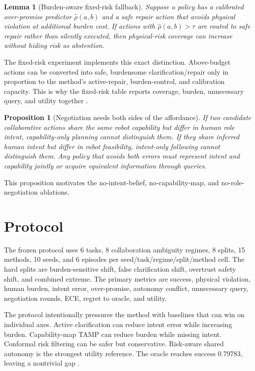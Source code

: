 \documentclass{article}
\newtheorem{lemma}{Lemma}
\newtheorem{proposition}{Proposition}
\begin{document}
\begin{lemma}[Burden-aware fixed-risk fallback]
Suppose a policy has a calibrated over-promise predictor $\hat \rho(a,b)$ and a safe repair action that avoids physical violation at additional burden cost. If actions with $\hat \rho(a,b)>\tau$ are routed to safe repair rather than silently executed, then physical-risk coverage can increase without hiding risk as abstention.
\end{lemma}
\noindent The fixed-risk experiment implements this exact distinction. Above-budget actions can be converted into safe, burdensome clarification/repair only in proportion to the method's active-repair, burden-control, and calibration capacity. This is why the fixed-risk table reports coverage, burden, unnecessary query, and utility together \citep{chan2020an31,rezayati2022improving32,liu2022human33,rahman2017cyberphysicalsocial34,umbrico2022design35,pantano2022influence36,zhou2022coupled37,bonello2024the38,wang2018controlling39,aldini2019effect40,angleraud2021coordinating41,kermenov2025near42,nobile2024a43}.

\begin{proposition}[Negotiation needs both sides of the affordance]
If two candidate collaborative actions share the same robot capability but differ in human role intent, capability-only planning cannot distinguish them. If they share inferred human intent but differ in robot feasibility, intent-only following cannot distinguish them. Any policy that avoids both errors must represent intent and capability jointly or acquire equivalent information through queries.
\end{proposition}
\noindent This proposition motivates the no-intent-belief, no-capability-map, and no-role-negotiation ablations.

\section{Protocol}
The frozen protocol uses 6 tasks, 8 collaboration ambiguity regimes, 8 splits, 15 methods, 10 seeds, and 6 episodes per seed/task/regime/split/method cell. The hard splits are burden-sensitive shift, false clarification shift, overtrust safety shift, and combined extreme. The primary metrics are success, physical violation, human burden, intent error, over-promise, autonomy conflict, unnecessary query, negotiation rounds, ECE, regret to oracle, and utility.

The protocol intentionally pressures the method with baselines that can win on individual axes. Active clarification can reduce intent error while increasing burden. Capability-map TAMP can reduce burden while missing intent. Conformal risk filtering can be safer but conservative. Risk-aware shared autonomy is the strongest utility reference. The oracle reaches success 0.79783, leaving a nontrivial gap \citep{ciccarelli2022a19,deng2017hierarchical20,rega2021collaborative21,raffik2023industry22,sun2023adaptive23,lemasurier2021methods24,liu2022workerintheloop25,lagomarsino2022robot26,jung2024touch27,loy2025exploring28,quenehen2022economic29,malik2019complexitybased30}.
\end{document}
